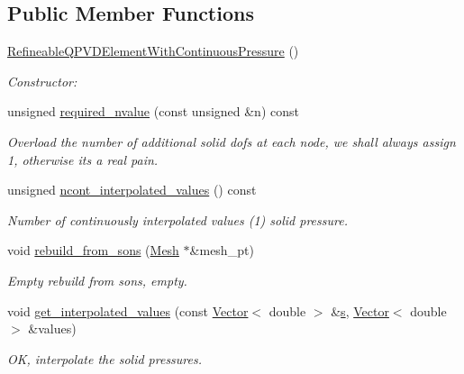 \subsection*{Public Member Functions}
\begin{DoxyCompactItemize}
\item 
\hyperlink{classoomph_1_1RefineableQPVDElementWithContinuousPressure_a5aca54f4029d1f729f7154df7c8c66da}{Refineable\+Q\+P\+V\+D\+Element\+With\+Continuous\+Pressure} ()
\begin{DoxyCompactList}\small\item\em Constructor\+: \end{DoxyCompactList}\item 
unsigned \hyperlink{classoomph_1_1RefineableQPVDElementWithContinuousPressure_a1ab39caa5f26573cb1d38ab8f9f0d76d}{required\+\_\+nvalue} (const unsigned \&n) const
\begin{DoxyCompactList}\small\item\em Overload the number of additional solid dofs at each node, we shall always assign 1, otherwise it\textquotesingle{}s a real pain. \end{DoxyCompactList}\item 
unsigned \hyperlink{classoomph_1_1RefineableQPVDElementWithContinuousPressure_ace99412d0a2d0015ce56c3ee4c375254}{ncont\+\_\+interpolated\+\_\+values} () const
\begin{DoxyCompactList}\small\item\em Number of continuously interpolated values (1) solid pressure. \end{DoxyCompactList}\item 
void \hyperlink{classoomph_1_1RefineableQPVDElementWithContinuousPressure_a1a0d400c3d74157cacca3f3329a07436}{rebuild\+\_\+from\+\_\+sons} (\hyperlink{classoomph_1_1Mesh}{Mesh} $\ast$\&mesh\+\_\+pt)
\begin{DoxyCompactList}\small\item\em Empty rebuild from sons, empty. \end{DoxyCompactList}\item 
void \hyperlink{classoomph_1_1RefineableQPVDElementWithContinuousPressure_aa30cbff68622fc6db42a85ce0afa3e77}{get\+\_\+interpolated\+\_\+values} (const \hyperlink{classoomph_1_1Vector}{Vector}$<$ double $>$ \&\hyperlink{cfortran_8h_ab7123126e4885ef647dd9c6e3807a21c}{s}, \hyperlink{classoomph_1_1Vector}{Vector}$<$ double $>$ \&values)
\begin{DoxyCompactList}\small\item\em OK, interpolate the solid pressures. \end{DoxyCompactList}\item 

\end{DoxyCompactItemize}
